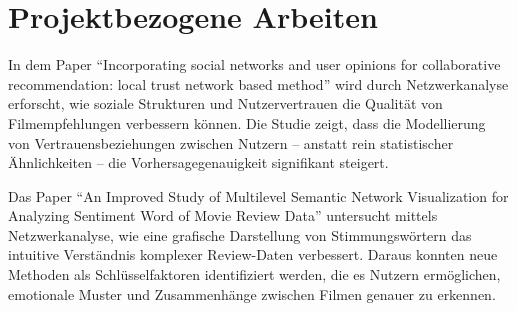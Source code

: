 \section{Projektbezogene Arbeiten}




In dem Paper \enquote{Incorporating social networks and user opinions for collaborative recommendation: local trust network based method} wird durch Netzwerkanalyse erforscht, wie soziale Strukturen und Nutzervertrauen die Qualität von Filmempfehlungen verbessern können.
Die Studie zeigt, dass die Modellierung von Vertrauensbeziehungen zwischen Nutzern -- anstatt rein statistischer Ähnlichkeiten -- die Vorhersagegenauigkeit signifikant steigert. \parencite{liu2010social}

Das Paper \enquote{An Improved Study of Multilevel Semantic Network Visualization for Analyzing Sentiment Word of Movie Review Data} untersucht mittels Netzwerkanalyse, wie eine grafische Darstellung von Stimmungswörtern das intuitive Verständnis komplexer Review-Daten verbessert.
Daraus konnten neue Methoden als Schlüsselfaktoren identifiziert werden, die es Nutzern ermöglichen, emotionale Muster und Zusammenhänge zwischen Filmen genauer zu erkennen. \parencite{ha2019}

